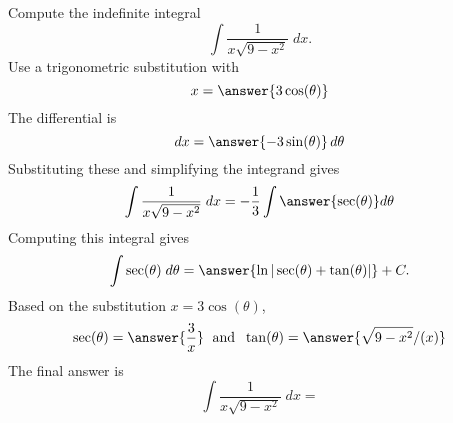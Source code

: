 \documentclass{ximera}
\begin{document}
\begin{problem}

Compute the indefinite integral
\[
\int \frac{1}{x\sqrt{9-x^2}}  \; dx.
\]
Use a trigonometric substitution with\\
\[
x = \answer{3\cos(\theta)}
\]
The differential is\\
\[
dx = \answer{-3\sin(\theta)}\,d\theta
\]
Substituting these and simplifying the integrand gives\\
\[
\int \frac{1}{x\sqrt{9-x^2}}  \; dx = -\frac13\int \answer{\sec(\theta)} d\theta
\]
Computing this integral gives
\[
\int \sec(\theta) \; d\theta = \answer{\ln|\sec(\theta) + \tan(\theta)|} + C.
\]
Based on the substitution $x = 3 \cos(\theta)$, \\
\[
\sec(\theta) = \answer{\frac{3}{x}} \; \text{ and } \; \tan(\theta) = \answer{\sqrt{9-x^2}/(x)}
\]
The final answer is
\[
\int  \frac{1}{x\sqrt{9-x^2}}  \; dx = 
\]
\begin{center}
\begin{multipleChoice}
\end{multipleChoice}
\end{center}

\end{problem}
\end{document}

